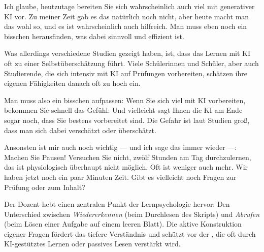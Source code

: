 \begin{spoken-clean}[01:25:39 - 01:28:09]
Ich glaube, heutzutage bereiten Sie sich wahrscheinlich auch viel mit generativer KI vor. Zu meiner Zeit gab es das natürlich noch nicht, aber heute macht man das wohl so, und es ist wahrscheinlich auch hilfreich. Man muss eben noch ein bisschen herausfinden, was dabei sinnvoll und effizient ist.

Was allerdings verschiedene Studien gezeigt haben, ist, dass das Lernen mit KI oft zu einer Selbstüberschätzung führt. Viele Schülerinnen und Schüler, aber auch Studierende, die sich intensiv mit KI auf Prüfungen vorbereiten, schätzen ihre eigenen Fähigkeiten danach oft zu hoch ein.

Man muss also ein bisschen aufpassen: Wenn Sie sich viel mit KI vorbereiten, bekommen Sie schnell das Gefühl:  Und vielleicht sagt Ihnen die KI am Ende sogar noch, dass Sie bestens vorbereitet sind. Die Gefahr ist laut Studien groß, dass man sich dabei verschätzt oder überschätzt.

Ansonsten ist mir auch noch wichtig --- und ich sage das immer wieder ---: Machen Sie Pausen! Versuchen Sie nicht, zwölf Stunden am Tag durchzulernen, das ist physiologisch überhaupt nicht möglich. Oft ist weniger auch mehr. Wir haben jetzt noch ein paar Minuten Zeit. Gibt es vielleicht noch Fragen zur Prüfung oder zum Inhalt?
\end{spoken-clean}

\begin{didactic-insight}
Der Dozent hebt einen zentralen Punkt der Lernpsychologie hervor: Den Unterschied zwischen \emph{Wiedererkennen} (beim Durchlesen des Skripts) und \emph{Abrufen} (beim Lösen einer Aufgabe auf einem leeren Blatt). Die aktive Konstruktion eigener Fragen fördert das tiefere Verständnis und schützt vor der , die oft durch KI-gestütztes Lernen oder passives Lesen verstärkt wird.
\end{didactic-insight}

